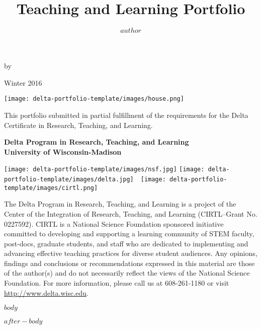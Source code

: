 \documentclass[12pt]{article}
\title{Teaching and Learning Portfolio}
\author{$author$}
\begin{document}
\begin{titlepage}
\begin{center}
\vspace*{0cm}
{\Large \textbf{\@title} \par}
\vspace{0.6cm}
{\Large by \par}
\vspace{0.6cm}
{\Large \textbf{\@author} \par}
\vspace{0.6cm}
{\Large Winter 2016 \par}
\vspace{1.0cm}
\texttt{[image: delta-portfolio-template/images/house.png]} \par
\vspace{1.0cm}
{This portfolio submitted in partial fulfillment of the requirements for the Delta Certificate in Research, Teaching, and Learning.\par}
\vspace{0.75cm}
{\textbf{ Delta Program in Research, Teaching, and Learning \\ University of Wisconsin-Madison }\par}
\vspace{0.75cm}
\texttt{[image: delta-portfolio-template/images/nsf.jpg]}
\texttt{[image: delta-portfolio-template/images/delta.jpg]}\ \ 
\texttt{[image: delta-portfolio-template/images/cirtl.png]}
\end{center}
{\tiny The Delta Program in Research, Teaching, and Learning is a project of the Center of the Integration of Research, Teaching, and Learning (CIRTL--Grant No. 0227592).  CIRTL is a National Science Foundation sponsored initiative committed to developing and supporting a learning community of STEM faculty, post-docs, graduate students, and staff who are dedicated to implementing  and advancing effective teaching practices for diverse student audiences.  Any opinions, findings and conclusions or recommendations expressed in this material are those of the author(s) and do not necessarily reflect the views of the National Science Foundation. For more information, please call us at 608-261-1180 or visit \url{http://www.delta.wisc.edu}. \par}
\end{titlepage}

\makeatletter
\let\ps@plain\ps@fancy 
\makeatother

\tableofcontents

\newpage
$body$

$after-body$
\end{document}
